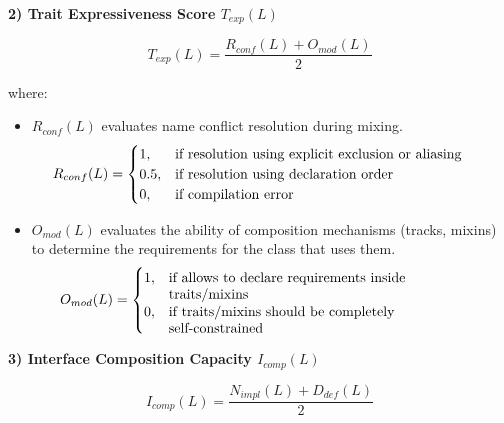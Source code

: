 \textbf{2) Trait Expressiveness Score $T_{exp}(L)$}

\[
T_{exp}(L) = \frac{R_{conf}(L) + O_{mod}(L)}{2}
\]

where:
\begin{itemize}
    \item $R_{conf}(L)$ evaluates name conflict resolution during mixing.
    \[
    R_{conf}(L) = 
    \begin{cases}
    1, & \text{\parbox[t]{0.65\linewidth}{\raggedright
            if resolution using explicit exclusion or aliasing%
         }} \\
    0.5, & \text{\parbox[t]{0.65\linewidth}{\raggedright
            if resolution using declaration order%
         }} \\
    0, & \text{\parbox[t]{0.65\linewidth}{\raggedright
            if compilation error%
         }}
    \end{cases}
    \]
    \item $O_{mod}(L)$ evaluates the ability of composition mechanisms (tracks, mixins) to determine the requirements for the class that uses them.
    \[
    O_{mod}(L) = 
    \begin{cases}
    1, & \text{\parbox[t]{0.65\linewidth}{\raggedright
            if allows to declare requirements inside traits/mixins%
         }} \\
    0, & \text{\parbox[t]{0.65\linewidth}{\raggedright
            if traits/mixins should be completely self-constrained%
         }}
    \end{cases}
    \]
\end{itemize}

\textbf{3) Interface Composition Capacity $I_{comp}(L)$}

\[
    I_{comp}(L) = \frac{N_{impl}(L) + D_{def}(L)}{2}
\]


